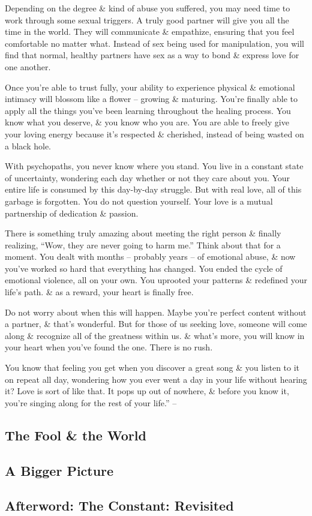 \documentclass{article}
\numberwithin{equation}{section}
\begin{document}
Depending on the degree \& kind of abuse you suffered, you may need time to work through some sexual triggers. A truly good partner will give you all the time in the world. They will communicate \& empathize, ensuring that you feel comfortable no matter what. Instead of sex being used for manipulation, you will find that normal, healthy partners have sex as a way to bond \& express love for one another.

Once you're able to trust fully, your ability to experience physical \& emotional intimacy will blossom like a flower -- growing \& maturing. You're finally able to apply all the things you've been learning throughout the healing process. You know what you deserve, \& you know who you are. You are able to freely give your loving energy because it's respected \& cherished, instead of being wasted on a black hole.

With psychopaths, you never know where you stand. You live in a constant state of uncertainty, wondering each day whether or not they care about you. Your entire life is consumed by this day-by-day struggle. But with real love, all of this garbage is forgotten. You do not question yourself. Your love is a mutual partnership of dedication \& passion.

There is something truly amazing about meeting the right person \& finally realizing, ``Wow, they are never going to harm me.'' Think about that for a moment. You dealt with months -- probably years -- of emotional abuse, \& now you've worked so hard that everything has changed. You ended the cycle of emotional violence, all on your own. You uprooted your patterns \& redefined your life's path. \& as a reward, your heart is finally free.

Do not worry about when this will happen. Maybe you're perfect content without a partner, \& that's wonderful. But for those of us seeking love, someone will come along \& recognize all of the greatness within us. \& what's more, you will know in your heart when you've found the one. There is no rush.

You know that feeling you get when you discover a great song \& you listen to it on repeat all day, wondering how you ever went a day in your life without hearing it? Love is sort of like that. It pops up out of nowhere, \& before you know it, you're singing along for the rest of your life.'' -- \cite[pp. 183--184]{MacKenzie2015}

\subsection{The Fool \& the World}

\subsection{A Bigger Picture}

\subsection{Afterword: The Constant: Revisited}


\printbibliography[heading=bibintoc]
	
\end{document}
